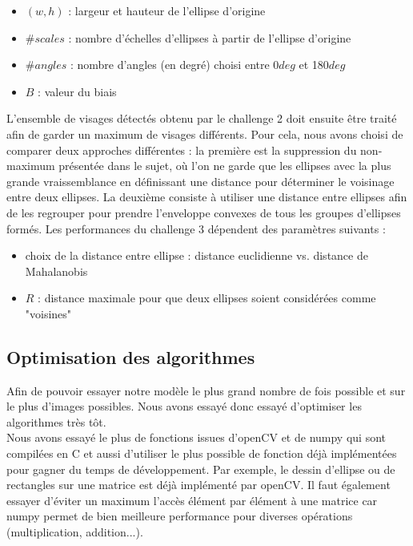 \documentclass[a4paper,12pt, openany]{book}
\theoremstyle{break}
\begin{document}
\begin{itemize}
  \item $(w, h)$ : largeur et hauteur de l'ellipse d'origine
  \item $\# scales$ : nombre d'échelles d'ellipses à partir de l'ellipse d'origine
  \item $\# angles$ : nombre d'angles (en degré) choisi entre 0$deg$ et 180$deg$
  \item $B$ : valeur du biais
\end{itemize}


L'ensemble de visages détectés obtenu par le challenge 2 doit ensuite être traité afin de garder un maximum de visages différents. Pour cela, nous avons choisi de comparer deux approches différentes : la première est la suppression du non-maximum présentée dans le sujet, où l'on ne garde que les ellipses avec la plus grande vraissemblance en définissant une distance pour déterminer le voisinage entre deux ellipses. La deuxième consiste à utiliser une distance entre ellipses afin de les regrouper pour prendre l'enveloppe convexes de tous les groupes d'ellipses formés. Les performances du challenge 3 dépendent des paramètres suivants :

\begin{itemize}
  \item choix de la distance entre ellipse : distance euclidienne vs. distance de Mahalanobis
  \item $R$ : distance maximale pour que deux ellipses soient considérées comme "voisines"
\end{itemize}

\subsection{Optimisation des algorithmes}

Afin de pouvoir essayer notre modèle le plus grand nombre de fois possible et sur le plus d'images possibles. Nous avons essayé donc essayé d'optimiser les algorithmes très tôt. \\
Nous avons essayé le plus de fonctions issues d'openCV et de numpy qui sont compilées en C et aussi d'utiliser le plus possible de fonction déjà implémentées pour gagner du temps de développement. Par exemple, le dessin d'ellipse ou de rectangles sur une matrice est déjà implémenté par openCV. Il faut également essayer d'éviter un maximum l'accès élément par élément à une matrice car numpy permet de bien meilleure performance pour diverses opérations (multiplication, addition...).
\end{document}
